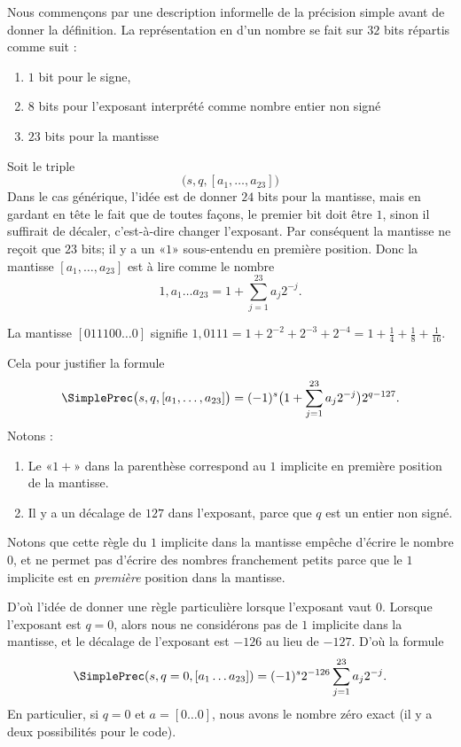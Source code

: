 Nous commençons par une description informelle de la précision simple avant de donner la définition. La représentation en  d'un nombre se fait sur \( 32\) bits répartis comme suit :
\begin{enumerate}
	\item
	      \( 1\) bit pour le signe,
	\item
	      \( 8\) bits pour l'exposant interprété comme nombre entier non signé
	\item
	      \( 23\) bits pour la mantisse
\end{enumerate}
Soit le triple
\begin{equation}
	\big( s,q,[a_1,\ldots, a_{23}] \big)
\end{equation}
Dans le cas générique, l'idée est de donner \( 24\) bits pour la mantisse, mais en gardant en tête le fait que de toutes façons, le premier bit doit être \( 1\), sinon il suffirait de décaler, c'est-à-dire changer l'exposant. Par conséquent la mantisse ne reçoit que \( 23\) bits; il y a un «\( 1\)» sous-entendu en première position. Donc la mantisse \( [a_1,\ldots, a_{23}]\) est à lire comme le nombre
\begin{equation}
	1,a_1\ldots a_{23}=1+\sum_{j=1}^{23}a_j2^{-j}.
\end{equation}
\begin{example}
	La mantisse \( [011100\ldots 0]\) signifie \(1,0111=1+2^{-2}+2^{-3}+2^{-4}=1+\frac{1}{ 4 }+\frac{1}{ 8 }+\frac{1}{ 16 } \).
\end{example}
Cela pour justifier la formule
\begin{equation}
	\SimplePrec\big( s,q,[a_1,\ldots, a_{23}] \big)=(-1)^s\big( 1+\sum_{j=1}^{23}a_j2^{-j} \big)2^{q-127}.
\end{equation}
Notons :
\begin{enumerate}
	\item
	      Le «\( 1+\)» dans la parenthèse correspond au \( 1\) implicite en première position de la mantisse.
	\item
	      Il y a un décalage de \( 127\) dans l'exposant, parce que \( q\) est un entier non signé.
\end{enumerate}

Notons que cette règle du \( 1\) implicite dans la mantisse empêche d'écrire le nombre \( 0\), et ne permet pas d'écrire des nombres franchement petits parce que le \( 1\) implicite est en \emph{première} position dans la mantisse.

D'où l'idée de donner une règle particulière lorsque l'exposant vaut \( 0\). Lorsque l'exposant est \( q=0\), alors nous ne considérons pas de \( 1\) implicite dans la mantisse, et le décalage de l'exposant est \( -126\) au lieu de \( -127\). D'où la formule
\begin{equation}
	\SimplePrec(s,q=0,[a_1\ldots a_{23}])=(-1)^s2^{-126}\sum_{j=1}^{23}a_j2^{-j}.
\end{equation}
En particulier, si \( q=0\) et \( a=[0\ldots 0]\), nous avons le nombre zéro exact (il y a deux possibilités pour le code).

